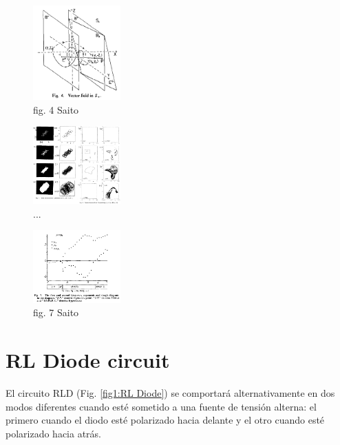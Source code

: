 \documentclass[%
 reprint,
 amsmath,amssymb,
 aps,
]{revtex4-2}
\begin{document}
\begin{figure}[h]
    \centering
    \includegraphics[width=0.3\textwidth]{Saito/fig. 4 Saito.png}
    \caption{fig. 4 Saito}
    \label{fig.4:saito}
\end{figure}

\begin{figure}[h]
    \centering
    \includegraphics[width=0.3\textwidth]{Saito/fig. 5 6 Saito.png}
    \caption{...}
    \label{fig.5-6:saito}
\end{figure}

\begin{figure}[h]
    \centering
    \includegraphics[width=0.3\textwidth]{Saito/fig 7 Saito.png}
    \caption{fig. 7 Saito}
    \label{fig.7:saito}
\end{figure}


\section{RL Diode circuit}
El circuito RLD (Fig. \ref{fig1:RL Diode}) se comportará alternativamente en dos modos diferentes cuando esté sometido a una fuente de tensión alterna: el primero cuando el diodo esté polarizado hacia delante y el otro cuando esté polarizado hacia atrás.
\end{document}
